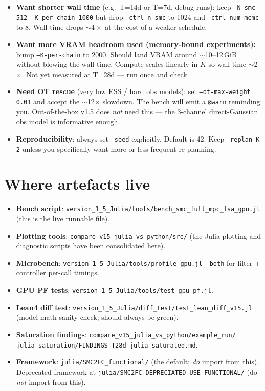 \documentclass[11pt,a4paper]{article}
\begin{document}
\begin{itemize}[leftmargin=*, itemsep=2pt]
\item \textbf{Want shorter wall time} (e.g.\ T=14d or T=7d, debug
runs): keep \texttt{--N-smc 512 --K-per-chain 1000} but drop
\texttt{--ctrl-n-smc} to 1024 and \texttt{--ctrl-num-mcmc} to 8. Wall
time drops $\sim 4\times$ at the cost of a weaker schedule.

\item \textbf{Want more VRAM headroom used (memory-bound experiments):}
bump \texttt{--K-per-chain} to 2000. Should land VRAM around
$\sim$10--12\,GiB without blowing the wall time. Compute scales linearly
in $K$ so wall time $\sim$2$\times$. Not yet measured at T=28d --- run
once and check.

\item \textbf{Need OT rescue} (very low ESS / hard obs models): set
\texttt{--ot-max-weight 0.01} and accept the $\sim$12$\times$ slowdown.
The bench will emit a \texttt{@warn} reminding you. Out-of-the-box
v1.5 does \emph{not} need this --- the 3-channel direct-Gaussian obs
model is informative enough.

\item \textbf{Reproducibility}: always set \texttt{--seed} explicitly.
Default is 42. Keep \texttt{--replan-K 2} unless you specifically want
more or less frequent re-planning.
\end{itemize}

\section*{Where artefacts live}

\begin{itemize}[leftmargin=*, itemsep=2pt]
\item \textbf{Bench script}:
\texttt{version\_1\_5\_Julia/tools/bench\_smc\_full\_mpc\_fsa\_gpu.jl}
(this is the live runnable file).
\item \textbf{Plotting tools}:
\texttt{compare\_v15\_julia\_vs\_python/src/} (the Julia plotting and
diagnostic scripts have been consolidated here).
\item \textbf{Microbench}:
\texttt{version\_1\_5\_Julia/tools/profile\_gpu.jl --both} for filter +
controller per-call timings.
\item \textbf{GPU PF tests}:
\texttt{version\_1\_5\_Julia/tools/test\_gpu\_pf.jl}.
\item \textbf{Lean4 diff test}:
\texttt{version\_1\_5\_Julia/diff\_test/test\_lean\_diff\_v15.jl}
(model-math sanity check; should always be green).
\item \textbf{Saturation findings}:
\texttt{compare\_v15\_julia\_vs\_python/example\_run/}\\
\texttt{julia\_saturation/FINDINGS\_T28d\_julia\_saturated.md}.
\item \textbf{Framework}:
\texttt{julia/SMC2FC\_functional/} (the default; \emph{do} import from
this). Deprecated framework at
\texttt{julia/SMC2FC\_DEPRECIATED\_USE\_FUNCTIONAL/} (do \emph{not}
import from this).
\end{itemize}
\end{document}
